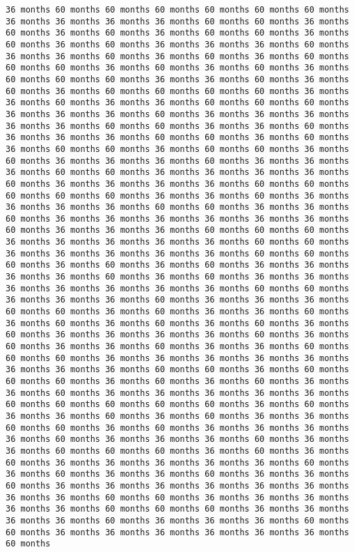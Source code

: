 \documentclass[11pt]{article}
\begin{document}
\begin{Verbatim}[commandchars=\\\{\}, frame=single, framerule=2mm, rulecolor=\color{outerrorbackground}]
36 months 60 months 60 months 60 months 60 months 60 months 60 months 36 months 36 months 36 months 36 months 60 months 60 months 36 months 60 months 36 months 60 months 36 months 60 months 60 months 36 months 60 months 36 months 60 months 36 months 36 months 36 months 60 months 36 months 36 months 60 months 36 months 60 months 36 months 60 months 60 months 60 months 36 months 60 months 36 months 60 months 36 months 60 months 60 months 60 months 36 months 36 months 60 months 36 months 60 months 36 months 60 months 60 months 60 months 60 months 36 months 36 months 60 months 36 months 36 months 60 months 60 months 60 months 36 months 36 months 36 months 60 months 36 months 36 months 36 months 36 months 36 months 60 months 60 months 36 months 36 months 60 months 36 months 36 months 36 months 60 months 60 months 36 months 60 months 36 months 60 months 60 months 36 months 60 months 60 months 36 months 60 months 36 months 36 months 36 months 60 months 36 months 36 months 36 months 60 months 60 months 36 months 36 months 36 months 36 months 60 months 36 months 36 months 36 months 36 months 60 months 60 months 60 months 60 months 60 months 36 months 36 months 60 months 36 months 36 months 36 months 36 months 60 months 60 months 36 months 36 months 60 months 36 months 36 months 36 months 36 months 36 months 36 months 60 months 36 months 36 months 36 months 60 months 60 months 60 months 36 months 36 months 36 months 36 months 36 months 60 months 60 months 36 months 36 months 36 months 36 months 36 months 60 months 60 months 60 months 36 months 60 months 36 months 60 months 36 months 36 months 36 months 36 months 60 months 36 months 60 months 36 months 36 months 36 months 36 months 36 months 36 months 36 months 60 months 60 months 36 months 36 months 36 months 60 months 36 months 36 months 36 months 60 months 60 months 36 months 60 months 36 months 36 months 60 months 36 months 60 months 36 months 60 months 36 months 60 months 36 months 60 months 36 months 36 months 36 months 36 months 60 months 36 months 60 months 36 months 36 months 60 months 36 months 36 months 60 months 60 months 60 months 36 months 36 months 36 months 36 months 36 months 36 months 36 months 36 months 60 months 60 months 36 months 60 months 60 months 60 months 36 months 60 months 36 months 60 months 36 months 36 months 60 months 36 months 36 months 36 months 36 months 36 months 60 months 60 months 60 months 60 months 60 months 36 months 60 months 36 months 36 months 60 months 36 months 60 months 36 months 36 months 60 months 60 months 36 months 60 months 36 months 36 months 36 months 36 months 60 months 36 months 36 months 36 months 60 months 36 months 36 months 60 months 60 months 60 months 36 months 60 months 36 months 60 months 36 months 36 months 36 months 36 months 36 months 60 months 36 months 60 months 36 months 36 months 60 months 36 months 36 months 60 months 36 months 36 months 36 months 36 months 36 months 36 months 36 months 36 months 60 months 60 months 36 months 36 months 36 months 36 months 36 months 60 months 60 months 60 months 36 months 36 months 36 months 36 months 60 months 36 months 36 months 36 months 60 months 60 months 36 months 36 months 36 months 36 months 36 months 36 months 60 months 
\end{Verbatim}
\end{document}
